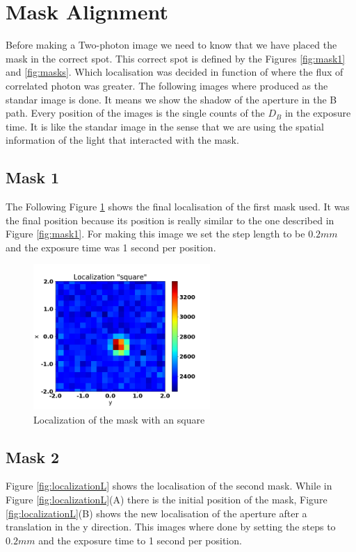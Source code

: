 \section{Mask Alignment}

Before making a Two-photon image we need to know that we have placed the mask in the correct 
spot. This correct spot is defined by the Figures \ref{fig:mask1} and \ref{fig:masks}. Which
localisation was decided in function of where the flux of correlated photon was greater.
The following images where produced as the standar image is done. It means we show the shadow
of the aperture in the B path. Every position of the images is the single 
counts of the $D_B$ in the exposure time. It is like the standar image in the sense 
that we are using the spatial information of the light that interacted with the mask.

\subsection{Mask 1}
The Following Figure \ref{fig:localizationSq} shows the final localisation of the first
mask used. It was the final position because its position is really similar to the one described
in Figure \ref{fig:mask1}. For making this image we set the step length to be $0.2mm$ and
the exposure time was 1 second per position.

\begin{figure}[h!]
\centering
\includegraphics[width=0.6\textwidth]{Figures/localizationSq.png} 
\caption{Localization of the mask with an square}
\label{fig:localizationSq}
\end{figure}

\subsection{Mask 2}
Figure \ref{fig:localizationL} shows the localisation of the second mask. While in Figure \ref{fig:localizationL}(A)
there is the initial position of the mask, Figure \ref{fig:localizationL}(B) shows
the new localisation of the aperture after a translation in the y direction. This images
where done by setting the steps to $0.2mm$ and the exposure time to 1 second per position.


